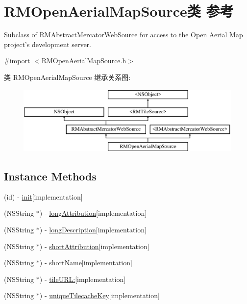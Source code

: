 \hypertarget{interface_r_m_open_aerial_map_source}{\section{R\-M\-Open\-Aerial\-Map\-Source类 参考}
\label{interface_r_m_open_aerial_map_source}
}


Subclass of \hyperlink{interface_r_m_abstract_mercator_web_source}{R\-M\-Abstract\-Mercator\-Web\-Source} for access to the Open Aerial Map project's development server.  




{\ttfamily \#import $<$R\-M\-Open\-Aerial\-Map\-Source.\-h$>$}

类 R\-M\-Open\-Aerial\-Map\-Source 继承关系图\-:\begin{figure}[H]
\begin{center}
\leavevmode
\includegraphics[height=3.425076cm]{interface_r_m_open_aerial_map_source}
\end{center}
\end{figure}
\subsection*{Instance Methods}
\begin{DoxyCompactItemize}
\item 
(id) -\/ \hyperlink{interface_r_m_open_aerial_map_source_a05c9a3ffef1c399e854f0aaaa252924e}{init}{\ttfamily  \mbox{[}implementation\mbox{]}}
\item 
(N\-S\-String $\ast$) -\/ \hyperlink{interface_r_m_open_aerial_map_source_a3ee5ed718434f321be5ad57fe4c527b8}{long\-Attribution}{\ttfamily  \mbox{[}implementation\mbox{]}}
\item 
(N\-S\-String $\ast$) -\/ \hyperlink{interface_r_m_open_aerial_map_source_a52f16e426510e04e68da57baa32e0a23}{long\-Description}{\ttfamily  \mbox{[}implementation\mbox{]}}
\item 
(N\-S\-String $\ast$) -\/ \hyperlink{interface_r_m_open_aerial_map_source_ac20a79118d42831a77a162d4e42f3309}{short\-Attribution}{\ttfamily  \mbox{[}implementation\mbox{]}}
\item 
(N\-S\-String $\ast$) -\/ \hyperlink{interface_r_m_open_aerial_map_source_aeee53f47d6b8e07c9db69a200e13738e}{short\-Name}{\ttfamily  \mbox{[}implementation\mbox{]}}
\item 
(N\-S\-String $\ast$) -\/ \hyperlink{interface_r_m_open_aerial_map_source_a4405601eb40cc53cf9d2f2875acc2be2}{tile\-U\-R\-L\-:}{\ttfamily  \mbox{[}implementation\mbox{]}}
\item 
(N\-S\-String $\ast$) -\/ \hyperlink{interface_r_m_open_aerial_map_source_a5da92a4a64ec3e3ecb36068b5264ca3f}{unique\-Tilecache\-Key}{\ttfamily  \mbox{[}implementation\mbox{]}}
\end{DoxyCompactItemize}
